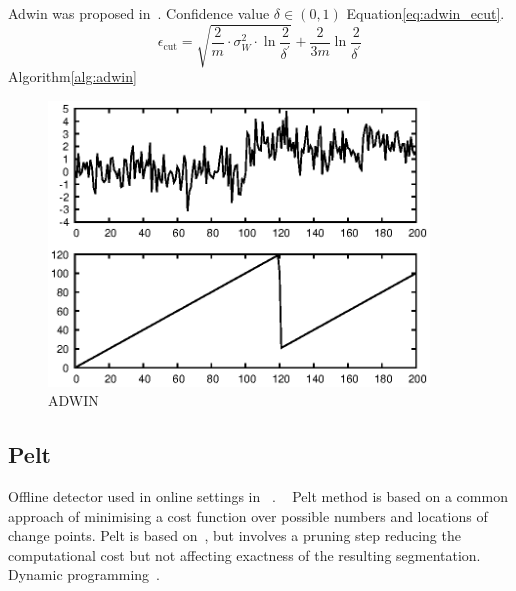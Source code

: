 Adwin was proposed in~\cite{bifet2007learning}.
Confidence value $\delta \in (0,1)$
Equation\ref{eq:adwin_ecut}.
\begin{equation}\label{eq:adwin_ecut}
	\epsilon_{\text{cut}} = \sqrt{\frac{2}{m} \cdot \sigma_W^2 \cdot \ln{\frac{2}{\delta^\prime}}} + \frac{2}{3m} \ln{\frac{2}{\delta^\prime}}
\end{equation}
Algorithm\ref{alg:adwin}

\begin{figure}[!htb]
	\centering
	\includegraphics[width=0.9\textwidth]{images/example_output_adwin.eps}
	\caption{ADWIN}\label{fig:adwin_output_example}
\end{figure}

\subsection{Pelt}

Offline detector used in online settings in ~\cite{marrero2013aclac}.
~\cite{killick2012optimal}
Pelt method is based on a common approach of  minimising a cost function over possible numbers and locations of change points.
Pelt is based on~\cite{jackson2005algorithm}, but involves a pruning step reducing the computational cost but not affecting exactness of the resulting segmentation.
Dynamic programming~\cite{bellman1966dynamic}.

